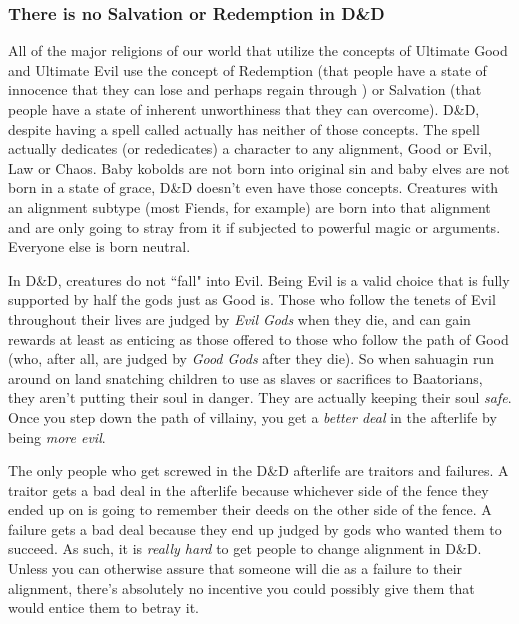 \subsubsection{There is no Salvation or Redemption in D\&D}
All of the major religions of our world that utilize the concepts of Ultimate Good and Ultimate Evil use the concept of Redemption (that people have a state of innocence that they can lose and perhaps regain through ) or Salvation (that people have a state of inherent unworthiness that they can overcome). D\&D, despite having a spell called  actually has neither of those concepts. The  spell actually dedicates (or rededicates) a character to any alignment, Good or Evil, Law or Chaos. Baby kobolds are not born into original sin and baby elves are not born in a state of grace, D\&D doesn't even have those concepts. Creatures with an alignment subtype (most Fiends, for example) are born into that alignment and are only going to stray from it if subjected to powerful magic or arguments. Everyone else is born neutral.

In D\&D, creatures do not ``fall" into Evil. Being Evil is a valid choice that is fully supported by half the gods just as Good is. Those who follow the tenets of Evil throughout their lives are judged by \textit{Evil Gods} when they die, and can gain rewards at least as enticing as those offered to those who follow the path of Good (who, after all, are judged by \textit{Good Gods} after they die). So when sahuagin run around on land snatching children to use as slaves or sacrifices to Baatorians, they aren't putting their soul in danger. They are actually keeping their soul \textit{safe}. Once you step down the path of villainy, you get a \textit{better deal} in the afterlife by being \textit{more evil}.

The only people who get screwed in the D\&D afterlife are traitors and failures. A traitor gets a bad deal in the afterlife because whichever side of the fence they ended up on is going to remember their deeds on the other side of the fence. A failure gets a bad deal because they end up judged by gods who wanted them to succeed. As such, it is \textit{really hard} to get people to change alignment in D\&D. Unless you can otherwise assure that someone will die as a failure to their alignment, there's absolutely no incentive you could possibly give them that would entice them to betray it.

